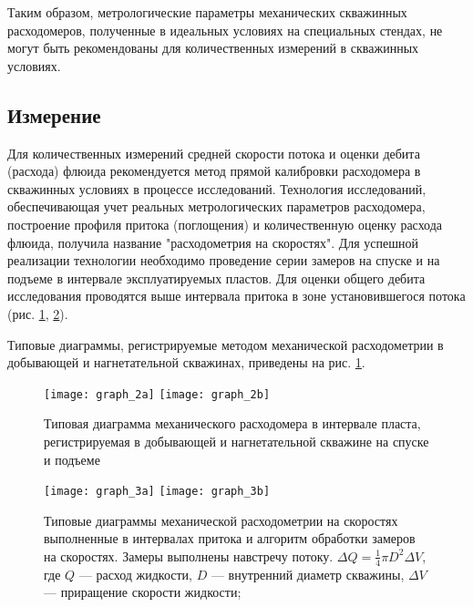 Таким образом, метрологические параметры механических
скважинных расходомеров, полученные в идеальных условиях на
специальных стендах, не могут быть рекомендованы для
количественных измерений в скважинных условиях.

\subsection{Измерение}

Для количественных измерений средней скорости потока и оценки
дебита (расхода) флюида рекомендуется метод прямой калибровки
расходомера в скважинных условиях в процессе исследований.
Технология исследований, обеспечивающая учет реальных
метрологических параметров расходомера, построение профиля
притока (поглощения) и количественную оценку расхода флюида,
получила название "расходометрия на скоростях". Для успешной
реализации технологии необходимо проведение серии замеров на
спуске и на подъеме в интервале эксплуатируемых пластов. Для оценки
общего дебита исследования проводятся выше интервала притока в
зоне установившегося потока (рис. \ref{fig:graph_2}, \ref{fig:graph_3}).

Типовые диаграммы, регистрируемые методом механической
расходометрии в добывающей и нагнетательной скважинах, приведены
на рис. \ref{fig:graph_2}.

\begin{figure}[h]
\centering
\texttt{[image: graph\_2a]}
\texttt{[image: graph\_2b]}
\caption{
Типовая диаграмма механического
расходомера в интервале
пласта, регистрируемая в
добывающей и нагнетательной скважине
на спуске и подъеме
}
\label{fig:graph_2}
\end{figure}

\begin{figure}[!h]
\centering
\texttt{[image: graph\_3a]}
\texttt{[image: graph\_3b]}
\caption{
Типовые диаграммы механической расходометрии на
скоростях выполненные в интервалах притока и алгоритм обработки
замеров на скоростях. Замеры выполнены навстречу потоку. $\Delta Q = \frac 1 4 \pi D^2 \Delta V$,
где $Q$ --- расход жидкости, $D$ --- внутренний диаметр скважины,
$\Delta V$ --- приращение скорости жидкости;
}
\label{fig:graph_3}
\end{figure}

\clearpage
